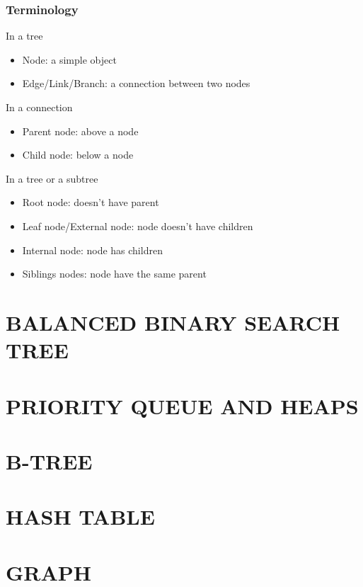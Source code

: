 \documentclass{article}
\begin{document}
\subsubsection{Terminology}
In a tree
\begin{itemize}
    \item Node: a simple object
    \item Edge/Link/Branch: a connection between two nodes
\end{itemize}

In a connection
\begin{itemize}
    \item Parent node: above a node
    \item Child node: below a node
\end{itemize}

In a tree or a subtree
\begin{itemize}
    \item Root node: doesn't have parent
    \item Leaf node/External node: node doesn't have children
    \item Internal node: node has children
    \item Siblings nodes: node have the same parent
\end{itemize}

\section{BALANCED BINARY SEARCH TREE}
\section{PRIORITY QUEUE AND HEAPS}
\section{B-TREE}
\section{HASH TABLE}
\section{GRAPH}
\end{document}
